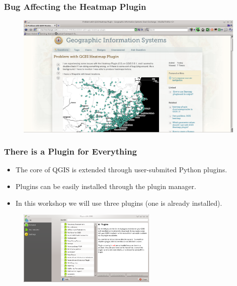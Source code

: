 \documentclass[hyperref={pdfpagelabels=true}]{beamer}
\begin{document}
\begin{frame}
\frametitle{Bug Affecting the Heatmap Plugin}
      
  \begin{figure}  
    \includegraphics[width=\textwidth]{bug.png}\\
    \end{figure}  
       
\end{frame}

\begin{frame}
\frametitle{There is a Plugin for Everything}

\begin{itemize}
  \item<1->The core of QGIS is extended through user-submited Python plugins.
  \item<3->Plugins can be easily installed through the plugin manager.%
  \item<4->In this workshop we will use three plugins (one is already installed).
\end{itemize}
      
  \begin{figure}  
    \includegraphics[width=0.6\textwidth]{plugins.png}\\
    \end{figure}         
\end{frame}
\end{document}
